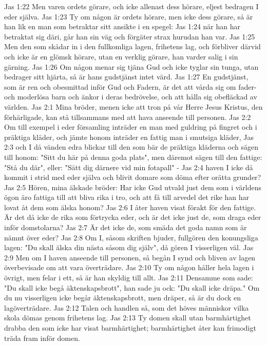 Jas 1:22  Men varen ordets görare, och icke allenast dess hörare, eljest bedragen I eder själva.
Jas 1:23  Ty om någon är ordets hörare, men icke dess görare, så är han lik en man som betraktar sitt ansikte i en spegel:
Jas 1:24  när han har betraktat sig däri, går han sin väg och förgäter strax hurudan han var.
Jas 1:25  Men den som skådar in i den fullkomliga lagen, frihetens lag, och förbliver därvid och icke är en glömsk hörare, utan en verklig görare, han varder salig i sin gärning.
Jas 1:26  Om någon menar sig tjäna Gud och icke tyglar sin tunga, utan bedrager sitt hjärta, så är hans gudstjänst intet värd.
Jas 1:27  En gudstjänst, som är ren och obesmittad inför Gud och Fadern, är det att vårda sig om fader- och moderlösa barn och änkor i deras bedrövelse, och att hålla sig obefläckad av världen.
Jas 2:1  Mina bröder, menen icke att tron på vår Herre Jesus Kristus, den förhärligade, kan stå tillsammans med att hava anseende till personen.
Jas 2:2  Om till exempel i eder församling inträder en man med guldring på fingret och i präktiga kläder, och jämte honom inträder en fattig man i smutsiga kläder,
Jas 2:3  och I då vänden edra blickar till den som bär de präktiga kläderna och sägen till honom: "Sitt du här på denna goda plats", men däremot sägen till den fattige: "Stå du där", eller: "Sätt dig därnere vid min fotapall" -
Jas 2:4  haven I icke då kommit i strid med eder själva och blivit domare som döma efter orätta grunder?
Jas 2:5  Hören, mina älskade bröder: Har icke Gud utvald just dem som i världens ögon äro fattiga till att bliva rika i tro, och att få till arvedel det rike han har lovat åt dem som älska honom?
Jas 2:6  I åter haven visat förakt för den fattige. Är det då icke de rika som förtrycka eder, och är det icke just de, som draga eder inför domstolarna?
Jas 2:7  Är det icke de, som smäda det goda namn som är nämnt över eder?
Jas 2:8  Om I, såsom skriften bjuder, fullgören den konungsliga lagen: "Du skall älska din nästa såsom dig själv", då gören I visserligen väl.
Jas 2:9  Men om I haven anseende till personen, så begån I synd och bliven av lagen överbevisade om att vara överträdare.
Jas 2:10  Ty om någon håller hela lagen i övrigt, men felar i ett, så är han skyldig till allt.
Jas 2:11  Densamme som sade: "Du skall icke begå äktenskapsbrott", han sade ju ock: "Du skall icke dräpa." Om du nu visserligen icke begår äktenskapsbrott, men dräper, så är du dock en lagöverträdare.
Jas 2:12  Talen och handlen så, som det höves människor vilka skola dömas genom frihetens lag.
Jas 2:13  Ty domen skall utan barmhärtighet drabba den som icke har visat barmhärtighet; barmhärtighet åter kan frimodigt träda fram inför domen.
